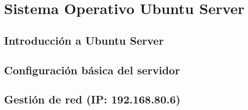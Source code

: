 \chapter{Sistema Operativo Ubuntu Server}
\section{Introducción a Ubuntu Server}
\section{Configuración básica del servidor}
\section{Gestión de red (IP: 192.168.80.6)}
